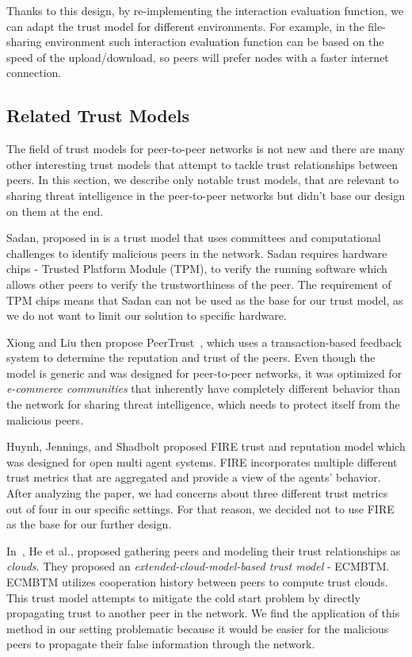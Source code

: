 Thanks to this design, by re-implementing the interaction evaluation function, we can adapt the trust model for different environments.
For example, in the file-sharing environment such interaction evaluation function can be based on the speed of the upload/download, so peers will prefer nodes with a faster internet connection.


\subsection{Related Trust Models}
\label{subsec:related-trust-models}
The field of trust models for peer-to-peer networks is not new and there are many other interesting trust models that attempt to tackle trust relationships between peers.
In this section, we describe only notable trust models, that are relevant to sharing threat intelligence in the peer-to-peer networks but didn't base our design on them at the end.

Sadan, proposed in \cite{abera2019sadan} is a trust model that uses committees and computational challenges to identify malicious peers in the network.
Sadan requires hardware chips - Trusted Platform Module (TPM), to verify the running software which allows other peers to verify the trustworthiness of the peer.
The requirement of TPM chips means that Sadan can not be used as the base for our trust model, as we do not want to limit our solution to specific hardware.

Xiong and Liu then propose PeerTrust~\cite{xiong2004peertrust}, which uses a transaction-based feedback system to determine the reputation and trust of the peers.
Even though the model is generic and was designed for peer-to-peer networks, it was optimized for \textit{e-commerce communities} that inherently have completely different behavior than the network for sharing threat intelligence, which needs to protect itself from the malicious peers.

Huynh, Jennings, and Shadbolt proposed FIRE trust and reputation model \cite{huynh2006integrated} which was designed for open multi agent systems.
FIRE incorporates multiple different trust metrics that are aggregated and provide a view of the agents' behavior.
After analyzing the paper, we had concerns about three different trust metrics out of four in our specific settings.
For that reason, we decided not to use FIRE as the base for our further design.

In~\cite{1562680}, He et al., proposed gathering peers and modeling their trust relationships as \textit{clouds}. They proposed an \textit{extended-cloud-model-based trust model} - ECMBTM.
ECMBTM utilizes cooperation history between peers to compute trust clouds. 
This trust model attempts to mitigate the cold start problem by directly propagating trust to another peer in the network.
We find the application of this method in our setting problematic because it would be easier for the malicious peers to propagate their false information through the network.

